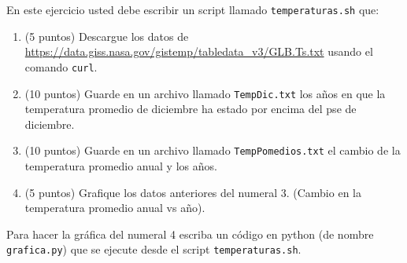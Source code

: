 \documentclass[11pt,letterpaper]{exam}
\begin{document}
\begin{questions}
En este ejercicio usted debe escribir un script llamado
\verb"temperaturas.sh" que: 

\begin{enumerate}
\item (5 puntos) Descargue los datos de
\url{https://data.giss.nasa.gov/gistemp/tabledata_v3/GLB.Ts.txt} usando el comando \verb"curl".
\item (10 puntos) Guarde en un archivo llamado \verb"TempDic.txt" los años en
que la temperatura promedio de diciembre ha estado por encima del
pse de diciembre.
\item (10 puntos) Guarde en un archivo llamado \verb"TempPomedios.txt"
  el cambio de la temperatura promedio anual y los años.
\item (5 puntos) Grafique los datos anteriores del numeral 3. 
(Cambio en la temperatura promedio anual vs año).
\end{enumerate}

Para hacer la gráfica del numeral 4 escriba un código en python (de
nombre \verb"grafica.py") que se ejecute desde el script
\verb"temperaturas.sh". 



\end{questions}
\end{document}
